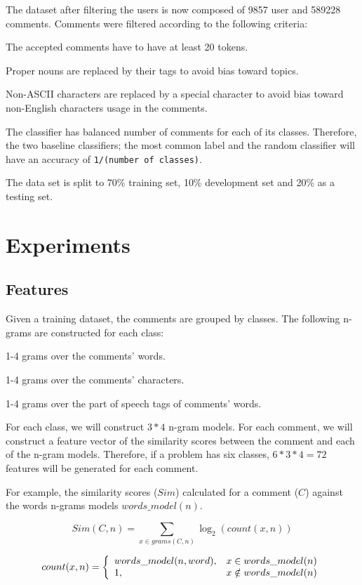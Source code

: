 \documentclass[10pt,a5paper,twoside]{article}
\begin{document}
The dataset after filtering the users is now composed of 9857 user and 589228
comments. Comments were filtered according to the following criteria:
\begin{compactitem}
\item The accepted comments have to have at least 20 tokens.
\item Proper nouns are replaced by their tags to avoid bias toward topics.
\item Non-ASCII characters are replaced by a special character to avoid bias
toward non-English characters usage in the comments.
\item The classifier has balanced number of comments for each of its classes.
  Therefore, the two baseline classifiers; the most common label and the random
  classifier will have an accuracy of \verb+1/(number of classes)+.
\item The data set is split to 70\% training set, 10\% development set and 20\%
as a testing set.
\end{compactitem}

\section{Experiments}
\subsection{Features}
\label{features}
Given a training dataset, the comments are grouped by classes. The following
n-grams are constructed for each class:
\begin{compactitem}
\item 1-4 grams over the comments' words.
\item 1-4 grams over the comments' characters.
\item 1-4 grams over the part of speech tags of comments' words.
\end{compactitem}
For each class, we will construct $3*4$ n-gram models. For each comment, we will
construct a feature vector of the similarity scores between
the comment and each of the n-gram models. Therefore, if a problem has six
classes, $6*3*4 = 72$ features will be generated for each comment.

For example, the similarity scores ($Sim$) calculated for a comment ($C$)
against the words n-grams models $words\_model(n)$.

\[
  Sim(C, n) = \sum_{x \in grams(C,n)} \log_2 (count(x, n))
\]

\[
  count(x, n) = \left\{
  \begin{array}{l l}
    words\_model(n, word), & x \in words\_model(n)\\
    1, & x \notin words\_model(n)\\
  \end{array} \right.
\]
\end{document}
